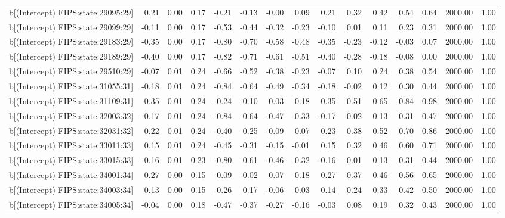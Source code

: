 \begin{table}[ht]
\begin{tabular}{rrrrrrrrrrrrrrr}
  b[(Intercept) FIPS:state:29095:29] & 0.21 & 0.00 & 0.17 & -0.21 & -0.13 & -0.00 & 0.09 & 0.21 & 0.32 & 0.42 & 0.54 & 0.64 & 2000.00 & 1.00 \\ 
  b[(Intercept) FIPS:state:29099:29] & -0.11 & 0.00 & 0.17 & -0.53 & -0.44 & -0.32 & -0.23 & -0.10 & 0.01 & 0.11 & 0.23 & 0.31 & 2000.00 & 1.00 \\ 
  b[(Intercept) FIPS:state:29183:29] & -0.35 & 0.00 & 0.17 & -0.80 & -0.70 & -0.58 & -0.48 & -0.35 & -0.23 & -0.12 & -0.03 & 0.07 & 2000.00 & 1.00 \\ 
  b[(Intercept) FIPS:state:29189:29] & -0.40 & 0.00 & 0.17 & -0.82 & -0.71 & -0.61 & -0.51 & -0.40 & -0.28 & -0.18 & -0.08 & 0.00 & 2000.00 & 1.00 \\ 
  b[(Intercept) FIPS:state:29510:29] & -0.07 & 0.01 & 0.24 & -0.66 & -0.52 & -0.38 & -0.23 & -0.07 & 0.10 & 0.24 & 0.38 & 0.54 & 2000.00 & 1.00 \\ 
  b[(Intercept) FIPS:state:31055:31] & -0.18 & 0.01 & 0.24 & -0.84 & -0.64 & -0.49 & -0.34 & -0.18 & -0.02 & 0.12 & 0.30 & 0.44 & 2000.00 & 1.00 \\ 
  b[(Intercept) FIPS:state:31109:31] & 0.35 & 0.01 & 0.24 & -0.24 & -0.10 & 0.03 & 0.18 & 0.35 & 0.51 & 0.65 & 0.84 & 0.98 & 2000.00 & 1.00 \\ 
  b[(Intercept) FIPS:state:32003:32] & -0.17 & 0.01 & 0.24 & -0.84 & -0.64 & -0.47 & -0.33 & -0.17 & -0.02 & 0.13 & 0.31 & 0.47 & 2000.00 & 1.00 \\ 
  b[(Intercept) FIPS:state:32031:32] & 0.22 & 0.01 & 0.24 & -0.40 & -0.25 & -0.09 & 0.07 & 0.23 & 0.38 & 0.52 & 0.70 & 0.86 & 2000.00 & 1.00 \\ 
  b[(Intercept) FIPS:state:33011:33] & 0.15 & 0.01 & 0.24 & -0.45 & -0.31 & -0.15 & -0.01 & 0.15 & 0.32 & 0.46 & 0.60 & 0.71 & 2000.00 & 1.00 \\ 
  b[(Intercept) FIPS:state:33015:33] & -0.16 & 0.01 & 0.23 & -0.80 & -0.61 & -0.46 & -0.32 & -0.16 & -0.01 & 0.13 & 0.31 & 0.44 & 2000.00 & 1.00 \\ 
  b[(Intercept) FIPS:state:34001:34] & 0.27 & 0.00 & 0.15 & -0.09 & -0.02 & 0.07 & 0.18 & 0.27 & 0.37 & 0.46 & 0.56 & 0.65 & 2000.00 & 1.00 \\ 
  b[(Intercept) FIPS:state:34003:34] & 0.13 & 0.00 & 0.15 & -0.26 & -0.17 & -0.06 & 0.03 & 0.14 & 0.24 & 0.33 & 0.42 & 0.50 & 2000.00 & 1.00 \\ 
  b[(Intercept) FIPS:state:34005:34] & -0.04 & 0.00 & 0.18 & -0.47 & -0.37 & -0.27 & -0.16 & -0.03 & 0.08 & 0.19 & 0.32 & 0.43 & 2000.00 & 1.00 \\ 

\end{tabular}
\end{table}
